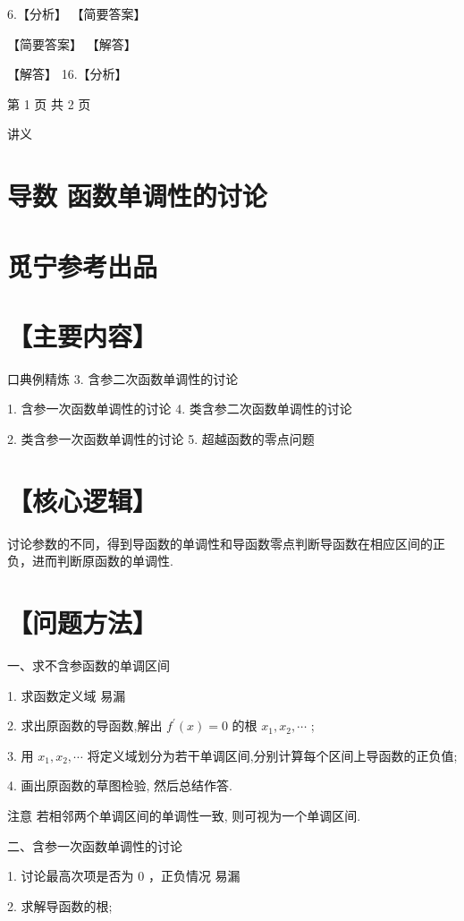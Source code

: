 \documentclass[10pt]{article}
\begin{document}
6.【分析】 【简要答案】

【简要答案】 【解答】

【解答】 16.【分析】

第 1 页 共 2 页

讲义

\section*{导数 函数单调性的讨论}

\section*{觅宁参考出品}

\section*{【主要内容】}

口典例精炼 3. 含参二次函数单调性的讨论

1. 含参一次函数单调性的讨论 4. 类含参二次函数单调性的讨论

2. 类含参一次函数单调性的讨论 5. 超越函数的零点问题

\section*{【核心逻辑】}

讨论参数的不同，得到导函数的单调性和导函数零点判断导函数在相应区间的正负，进而判断原函数的单调性.

\section*{【问题方法】}

一、求不含参函数的单调区间

1. 求函数定义域 易漏

2. 求出原函数的导函数,解出 \({f}^{\prime }\left( x\right)  = 0\) 的根 \({x}_{1},{x}_{2},\cdots\) ;

3. 用 \({x}_{1},{x}_{2},\cdots\) 将定义域划分为若干单调区间,分别计算每个区间上导函数的正负值;

4. 画出原函数的草图检验, 然后总结作答.

注意 若相邻两个单调区间的单调性一致, 则可视为一个单调区间.

二、含参一次函数单调性的讨论

1. 讨论最高次项是否为 0 ，正负情况 易漏

2. 求解导函数的根;
\end{document}
